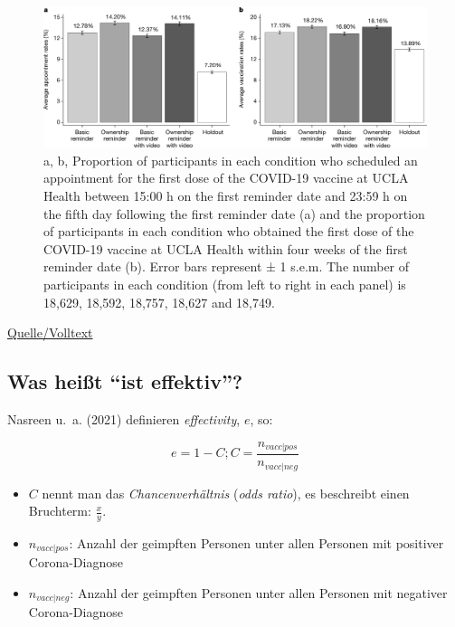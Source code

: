 \documentclass[
  a4paper,
  DIV=11]{scrreprt}
\providecommand{\tightlist}{%
  \setlength{\itemsep}{0pt}\setlength{\parskip}{0pt}}\usepackage{longtable,booktabs,array}
\theoremstyle{definition}
\theoremstyle{remark}
\begin{document}
\begin{figure}

{\centering \includegraphics[width=1\textwidth,height=\textheight]{./img/41586_2021_3843_Fig2_HTML.png}

}

\caption{\label{fig-dai}a, b, Proportion of participants in each
condition who scheduled an appointment for the first dose of the
COVID-19 vaccine at UCLA Health between 15:00 h on the first reminder
date and 23:59 h on the fifth day following the first reminder date (a)
and the proportion of participants in each condition who obtained the
first dose of the COVID-19 vaccine at UCLA Health within four weeks of
the first reminder date (b). Error bars represent ± 1 s.e.m. The number
of participants in each condition (from left to right in each panel) is
18,629, 18,592, 18,757, 18,627 and 18,749.}

\end{figure}

\href{https://www.nature.com/articles/s41586-021-03843-2}{Quelle/Volltext}

\hypertarget{was-heiuxdft-ist-effektiv}{%
\subsection{Was heißt ``ist
effektiv''?}\label{was-heiuxdft-ist-effektiv}}

Nasreen u.~a. (2021) definieren \emph{effectivity}, \(e\), so:

\[e = 1 - C; C= \frac{n_{vacc|pos}}{n_{vacc|neg}}\]

\begin{itemize}
\tightlist
\item
  \(C\) nennt man das \emph{Chancenverhältnis} (\emph{odds ratio}), es
  beschreibt einen Bruchterm: \(\frac{x}{y}\).
\item
  \(n_{vacc|pos}\): Anzahl der geimpften Personen unter allen Personen
  mit positiver Corona-Diagnose
\item
  \(n_{vacc|neg}\): Anzahl der geimpften Personen unter allen Personen
  mit negativer Corona-Diagnose
\end{itemize}
\end{document}

